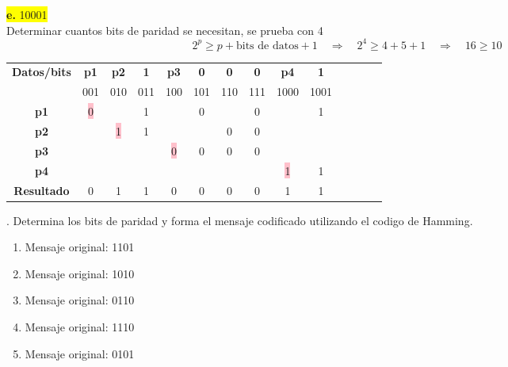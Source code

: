 \documentclass{article}
\begin{document}
	\begin{center}
		\hspace{3cm}\colorbox{yellow}{{\textbf{e.} 10001}}\newline
		\\Determinar cuantos bits de paridad se necesitan, se prueba con 4
		\[
		2^p \geq p + \text{bits de datos} + 1
		\quad \Rightarrow \quad	2^4 \geq 4 + 5 + 1 \quad \Rightarrow \quad 16 \geq 10
		\]
		
		\begin{table}[h!]
			\centering
			\begin{tabular}{c|ccccccccccccc}
				\toprule
				\textbf{Datos/bits} & \textbf{p1} & \textbf{p2} & \textbf{1} & \textbf{p3} & \textbf{0} & \textbf{0} & \textbf{0} & \textbf{p4} & \textbf{1}\\ & \scriptsize001 & \scriptsize010 & \scriptsize011 & \scriptsize100 & \scriptsize101 & \scriptsize110 & \scriptsize111 & \scriptsize1000 & \scriptsize1001\\
				\midrule
				\textbf{p1} & \colorbox{pink}{0} & & 1 & & 0 & & 0 & & 1\\
				\midrule
				\textbf{p2} &  & \colorbox{pink}{1} & 1 & & & 0 & 0 & & \\
				\midrule
				\textbf{p3} & & & & \colorbox{pink}{0} & 0 & 0 & 0 & & \\
				\midrule
				\textbf{p4} & & & & & & & & \colorbox{pink}{1} & 1\\
				\midrule
				\midrule
				\textbf{Resultado} & 0 & 1 & 1 & 0 & 0 & 0 & 0 & 1 & 1\\
				\bottomrule
			\end{tabular}
		\end{table}
	\end{center}
	\vspace{1cm}
	. Determina los bits de paridad y forma el mensaje codificado utilizando el codigo de
	Hamming.
	\begin{enumerate}
	\item Mensaje original: 1101
	\item Mensaje original: 1010
	\item Mensaje original: 0110
	\item Mensaje original: 1110
	\item Mensaje original: 0101
	\end{enumerate}
	
\end{document}
